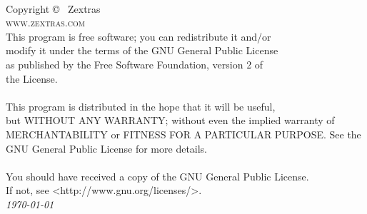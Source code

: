 
\newpage
~\vfill
\thispagestyle{empty}

Copyright \copyright\ \the\year{} Zextras \\ %

\textsc{www.zextras.com}\\ %

This program is free software; you can redistribute it and/or\\
modify it under the terms of the GNU General Public License\\
as published by the Free Software Foundation, version 2 of\\
the License.\\
\\
This program is distributed in the hope that it will be useful,\\
but WITHOUT ANY WARRANTY; without even the implied warranty of\\
MERCHANTABILITY or FITNESS FOR A PARTICULAR PURPOSE.  See the\\
GNU General Public License for more details.\\
\\
You should have received a copy of the GNU General Public License.\\
If not, see <http://www.gnu.org/licenses/>.\\

\textit{\today} %
